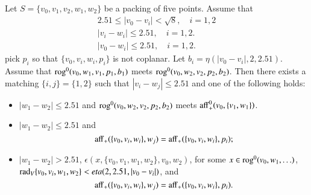 \begin{tarskidata}
\begin{tarski}
\begin{lemma}
Let $S=\{v_0,v_1,v_2,w_1,w_2\}$ be a packing of five points.
  Assume that
  $$\begin{array}{lll}
  2.51 \le |v_0-v_i| < \sqrt8,\quad i=1,2\\
  |v_i-w_i|\le 2.51, \quad i=1,2.\\
  |v_0-w_i|\le 2.51,\quad i=1,2.
  \end{array}
  $$
pick $p_i$ so that $\{v_0,v_i,w_i,p_i\}$ is not coplanar.
Let $b_i=\eta(|v_0-v_i|,2,2.51)$.  
%
Assume that ${\operatorname{rog}}^0(v_0,w_1,v_1,p_1,b_1)$ meets
  ${\operatorname{rog}}^0(v_0,w_2,v_2,p_2,b_2)$.
Then there exists a matching $\{i,j\}=\{1,2\}$ 
such that $|v_i-w_j|\le 2.51$ and one of the following holds:
\begin{itemize}
     \item $|w_1-w_2|\le 2.51$ and ${\operatorname{rog}}^0(v_0,w_2,v_2,p_2,b_2)$ meets
           ${\operatorname{aff}}_+^0(v_0,\{v_1,w_1\})$.
       \item $|w_1-w_2|\le 2.51$ and 
     $$
     {\operatorname{aff}}_+(\{v_0,v_i,w_i\},w_j) = {\operatorname{aff}}_+(\{v_0,v_i,w_i\},p_i);
     $$
              \item $|w_1-w_2|> 2.51$, $\epsilon(x,\{v_0,v_1,w_1,w_2\},v_0,w_2)$,
                for some $x\in {\operatorname{rog}}^0(v_0,w_1,\ldots)$, 
             $\operatorname{rad}_V\{v_0,v_i,w_1,w_2\}<eta(2,2.51,|v_0-v_i|)$, and
    $$
     {\operatorname{aff}}_+(\{v_0,v_i,w_i\},w_j) = {\operatorname{aff}}_+(\{v_0,v_i,w_i\},p_i).
     $$
\end{itemize}
\end{lemma}


\end{tarski}
\end{tarskidata}

